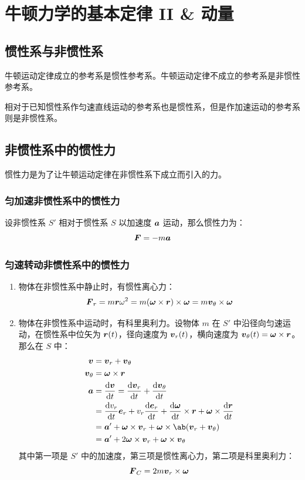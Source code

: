 \section{牛顿力学的基本定律 II \& 动量}

\subsection{惯性系与非惯性系}

牛顿运动定律成立的参考系是惯性参考系。牛顿运动定律不成立的参考系是非惯性参考系。

相对于已知惯性系作匀速直线运动的参考系也是惯性系，但是作加速运动的参考系则是非惯性系。

\subsection{非惯性系中的惯性力}

惯性力是为了让牛顿运动定律在非惯性系下成立而引入的力。

\subsubsection{匀加速非惯性系中的惯性力}

设非惯性系 $S'$ 相对于惯性系 $S$ 以加速度 $\boldsymbol{a}$ 运动，那么惯性力为：
$$
\boldsymbol{F} = -m \boldsymbol{a}
$$

\subsubsection{匀速转动非惯性系中的惯性力}

\begin{enumerate}
    \item 物体在非惯性系中静止时，有惯性离心力：
    $$
    \boldsymbol{F}_r = m \boldsymbol{r} \omega^2 = m (\boldsymbol{\omega} \times \boldsymbol{r}) \times \boldsymbol{\omega} = m \boldsymbol{v}_{\theta} \times \boldsymbol{\omega}
    $$
    \item 物体在非惯性系中运动时，有科里奥利力。设物体 $m$ 在 $S'$ 中沿径向匀速运动，在惯性系中位矢为 $\boldsymbol{r}(t)$，径向速度为 $\boldsymbol{v}_r(t)$，横向速度为 $\boldsymbol{v}_\theta(t) = \boldsymbol{\omega} \times \boldsymbol{r}$。那么在 $S$ 中：
    $$
    \begin{aligned}
        \vect{v} & = \vect{v}_r + \vect{v}_{\theta} \\
        \vect{v}_{\theta} & = \vect{\omega} \times \vect{r} \\
        \vect{a} & = \dv{\vect{v}}{t} = \dv{\vect{v}_r}{t} + \dv{\vect{v}_{\theta}}{t} \\
        & = \dv{v_r}{t} \vect{e}_r + v_r \dv{\vect{e}_r}{t} + \dv{\vect{\omega}}{t} \times \vect{r} + \vect{\omega} \times \dv{\vect{r}}{t} \\
        & = \vect{a}' + \vect{\omega} \times \vect{v}_r + \vect{\omega} \times \ab(\vect{v}_{r} + \vect{v}_{\theta}) \\
        & = \vect{a}' + 2 \vect{\omega} \times \vect{v}_r + \vect{\omega} \times \vect{v}_{\theta}
    \end{aligned}
    $$
    其中第一项是 $S'$ 中的加速度，第三项是惯性离心力，第二项是科里奥利力：
    $$
    \boldsymbol{F}_C = 2 m \boldsymbol{v}_r \times \boldsymbol{\omega}
    $$
\end{enumerate}

